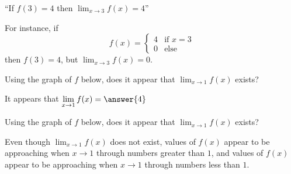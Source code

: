 \documentclass{ximera}
\begin{document}
\begin{question}
``If $f(3) = 4$ then $\displaystyle \lim_{x \to 3} f(x) = 4$''

\begin{multipleChoice}
\end{multipleChoice}

\begin{feedback}
  For instance, if
  \[
  f(x) =
  \begin{cases}
    4 &\text{if $x=3$} \\
    0 &\text{else}
  \end{cases}
  \]
  then $f(3)=4$, but $\lim_{x \to 3} f(x) =0$.
\end{feedback}
\end{question}

\begin{question}
Using the graph of $f$ below, does it appear that $\lim_{x \to 1} f(x)$ exists?  


\begin{multiple-choice}
\end{multiple-choice}


\begin{question}
	It appears that $\lim_{x\to 1} f(x) =  \answer{4}$ 
\end{question}


\end{question}



\begin{question}
Using the graph of $f$ below, does it appear that $\lim_{x \to 1} f(x)$ exists?  


\begin{multiple-choice}
\end{multiple-choice}


\begin{question}
  Even though $\lim_{x \to 1} f(x)$ does not exist, values of
  $f(x)$ appear to be approaching  when $x \to 1$
  through numbers greater than $1$, and values of $f(x)$ appear
  to be approaching  when $x \to 1$ through numbers
  less than $1$.
\end{question}

\end{question}
\end{document}
